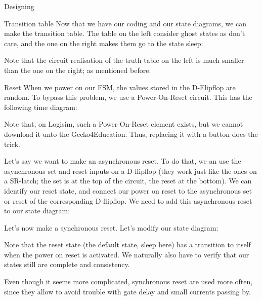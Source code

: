 \documentclass[a4paper]{article}
\begin{document}
\begin{parag}{Designing}
    \begin{subparag}{Transition table}
        Now that we have our coding and our state diagrams, we can make the transition table. The table on the left consider ghost states as don't care, and the one on the right makes them go to the state sleep:

        Note that the circuit realisation of the truth table on the left is much smaller than the one on the right; as mentioned before.
    \end{subparag}

    \begin{subparag}{Reset}
        When we power on our FSM, the values stored in the D-Flipflop are random. To bypass this problem, we use a Power-On-Reset circuit. This has the following time diagram:

        Note that, on Logisim, such a Power-On-Reset element exists, but we cannot download it unto the Gecko4Education. Thus, replacing it with a button does the trick.

        Let's say we want to make an asynchronous reset. To do that, we an use the asynchronous set and reset inputs on a D-flipflop (they work just like the ones on a SR-latch; the set is at the top of the circuit, the reset at the bottom). We can identify our reset state, and connect our power on reset to the asynchronous set or reset of the corresponding D-flipflop. We need to add this asynchronous reset to our state diagram:

        Let's now make a synchronous reset. Let's modify our state diagram:

        Note that the reset state (the default state, sleep here) has a transition to itself when the power on reset is activated. We naturally also have to verify that our states still are complete and consistency.

        Even though it seems more complicated, synchronous reset are used more often, since they allow to avoid trouble with gate delay and small currents passing by.
    \end{subparag}
    
    
    
\end{parag}
\end{document}
